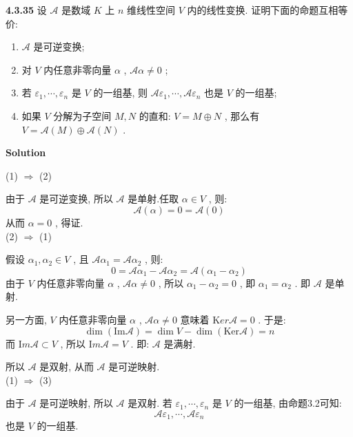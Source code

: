 \documentclass[11pt,a4paper,openany,oneside]{book}
\newcommand{\Ker}{\mathrm Ker}
\newcommand{\Image}{\mathrm Im}
\newcommand\Solution{\noindent\textbf{\textsf{Solution}}\par\medskip}
\begin{document}
\begin{myexample}
	\textbf{4.3.35} 设 $ \mathcal{A} $ 是数域 $ K $ 上 $ n $ 维线性空间 $ V $ 内的线性变换. 证明下面的命题互相等价:
\begin{enumerate}[(1)]
	\item $ \mathcal{A} $ 是可逆变换; 
	
	\item 对 $ V $ 内任意非零向量 $ \alpha $ ,  $ \mathcal{A}\alpha \neq 0 $ ;
	
	\item 若 $ \varepsilon_1, \cdots, \varepsilon_n $ 是 $ V $ 的一组基, 则 $ \mathcal{A}\varepsilon_1, \cdots, \mathcal{A}\varepsilon_n $ 也是 $ V $ 的一组基; 
	
	\item 如果 $ V $ 分解为子空间 $ M,N $ 的直和:  $ V = M \oplus  N $ , 那么有 $ V = \mathcal{A}(M) \oplus  \mathcal{A}(N) $ . 
\end{enumerate}

\end{myexample}
\Solution


(1)  $ \Longrightarrow $  (2)

由于 $ \mathcal{A} $ 是可逆变换, 所以 $ \mathcal{A} $ 是单射.任取 $ \alpha \in V $ , 则:
 $$  \mathcal{A}(\alpha) = 0 = \mathcal{A}(0)  $$ 
从而 $ \alpha=0 $ , 得证. \\

(2)   $ \Longrightarrow $  (1) 

假设 $ \alpha_1, \alpha_2 \in V $ , 且 $ \mathcal{A}\alpha_1 = \mathcal{A}\alpha_2 $ , 则:
 $$  0 = \mathcal{A}\alpha_1 - \mathcal{A}\alpha_2 = \mathcal{A}(\alpha_1 - \alpha_2)  $$ 
由于 $ V $ 内任意非零向量 $ \alpha $ ,  $ \mathcal{A}\alpha \neq 0 $ , 所以 $ \alpha_1 - \alpha_2 =0 $ , 即 $ \alpha_1 = \alpha_2 $ . 即 $ \mathcal{A} $ 是单射.

另一方面,  $ V $ 内任意非零向量 $ \alpha $ ,  $ \mathcal{A}\alpha \neq 0 $ 意味着 $ \Ker\mathcal{A}=0 $ . 于是:
 $$  \dim ( \mathrm{Im} \mathcal{A}) = \dim V - \dim ( \mathrm{Ker} \mathcal{A}) = n  $$ 
而 $ \Image\mathcal{A} \subset V $ , 所以 $\Image \mathcal{A} = V $ . 即: $ \mathcal{A} $ 是满射.

所以 $ \mathcal{A} $ 是双射, 从而 $ \mathcal{A} $ 是可逆映射. \\

(1)  $ \Longrightarrow $  (3) 

由于 $ \mathcal{A} $ 是可逆映射, 所以 $ \mathcal{A} $ 是双射. 若 $ \varepsilon_1, \cdots, \varepsilon_n $ 是 $ V $ 的一组基, 由命题3.2可知:
 $$  \mathcal{A}\varepsilon_1, \cdots, \mathcal{A}\varepsilon_n   $$ 
也是 $ V $ 的一组基. \\ 
\end{document}
